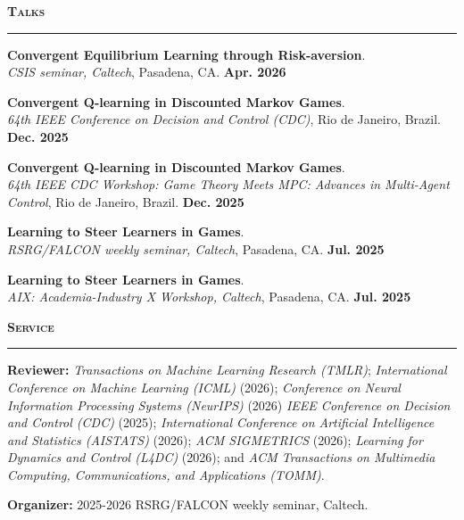 \documentclass[11pt]{article}
\newcommand{\Section}[1]{%
  \vspace{0.9\baselineskip}%
  {\large\bfseries\scshape #1}\\[-0.35\baselineskip]
  \rule{\linewidth}{0.4pt}\vspace{0.35\baselineskip}%
}
\begin{document}


\Section{Talks}
\begin{list2}
\item[] \textbf{Convergent Equilibrium Learning through Risk-aversion}. \\
\textit{CSIS seminar, Caltech}, Pasadena, CA. {\hfill \bf Apr. 2026}
\item[] \textbf{Convergent Q-learning in Discounted Markov Games}. \\
\textit{64th IEEE Conference on Decision and Control (CDC)}, Rio de Janeiro, Brazil. {\hfill \bf Dec. 2025}
\item[] \textbf{Convergent Q-learning in Discounted Markov Games}. \\
\textit{64th IEEE CDC Workshop: Game Theory Meets MPC: Advances in Multi-Agent Control}, Rio de Janeiro, Brazil. {\hfill \bf Dec. 2025}
\item[] \textbf{Learning to Steer Learners in Games}. \\
\textit{RSRG/FALCON weekly seminar, Caltech}, Pasadena, CA. {\hfill \bf Jul. 2025}
\item[] \textbf{Learning to Steer Learners in Games}. \\
\textit{AIX: Academia-Industry X Workshop, Caltech}, Pasadena, CA. {\hfill \bf Jul. 2025}
\end{list2}


\Section{Service}
\begin{list2}
\item[] \textbf{Reviewer:} \textit{Transactions on Machine Learning Research (TMLR)}; \textit{International Conference on Machine Learning (ICML)} (2026); \textit{Conference on Neural Information Processing Systems (NeurIPS)} (2026) \textit{IEEE Conference on Decision and Control (CDC)} (2025); \textit{International Conference on Artificial Intelligence and Statistics (AISTATS)} (2026); \textit{ACM SIGMETRICS} (2026); \textit{Learning for Dynamics and Control (L4DC)} (2026); and \textit{ACM Transactions on Multimedia Computing, Communications, and Applications (TOMM)}.
\item[] \textbf{Organizer:} 2025-2026 RSRG/FALCON weekly seminar, Caltech.
\end{list2}

\end{document}
